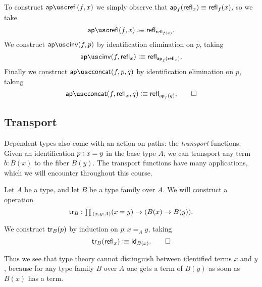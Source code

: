 \begin{constr}
To construct $\aprefl(f,x)$ we simply observe that ${\ap{f}{\refl{x}}}\jdeq {\refl{f}(x)}$, so we take
\begin{equation*}
\aprefl(f,x)\defeq\refl{\refl{f(x)}}.
\end{equation*}
We construct $\apinv(f,p)$ by identification elimination on $p$, taking
\begin{equation*}
\apinv(f,\refl{x}) \defeq \refl{\ap{f}{\refl{x}}}.
\end{equation*}
Finally we construct $\apconcat(f,p,q)$ by identification elimination on $p$, taking
\begin{equation*}
\apconcat(f,\refl{x},q)  \defeq \refl{\ap{f}{q}}.\qedhere
\end{equation*}
\end{constr}

\subsection{Transport}

Dependent types also come with an action on paths: the \emph{transport} functions.
Given an identification $p:\id{x}{y}$ in the base type $A$, we can transport any term $b:B(x)$ to the fiber $B(y)$.
The transport functions have many applications, which we will encounter throughout this course.

\begin{defn}
Let $A$ be a type, and let $B$ be a type family over $A$.
We will construct a  operation
\begin{equation*}
\tr_B:\prd{x,y:A} (\id{x}{y})\to (B(x)\to B(y)).
\end{equation*}
\end{defn}

\begin{constr}
We construct $\tr_B(p)$ by induction on $p:x=_A y$, taking
\begin{equation*}
\tr_B(\refl{x}) \defeq \idfunc[B(x)].\qedhere
\end{equation*}
\end{constr}

Thus we see that type theory cannot distinguish between identified terms $x$ and $y$, because for any type family $B$ over $A$ one gets a term of $B(y)$ as soon as $B(x)$ has a term.

